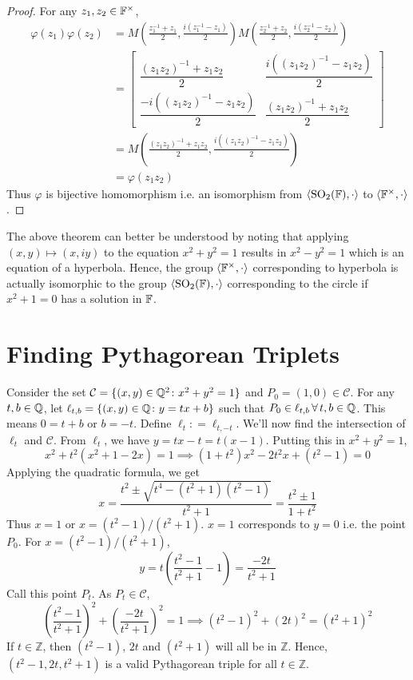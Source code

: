 \begin{proof}
    \noindent
    For any $z_1,z_2\in\mathbb{F}^\times$,
    \begin{align*}
        \varphi(z_1)\varphi(z_2) &= M\left(\frac{z_1^{-1}+z_1}{2},\frac{i(z_1^{-1}-z_1)}{2}\right)M\left(\frac{z_2^{-1}+z_2}{2},\frac{i(z_2^{-1}-z_2)}{2}\right) \\
                                 &= \begin{bmatrix}
                                        \dfrac{(z_1 z_2)^{-1} + z_1 z_2}{2} &
                                        \dfrac{i((z_1 z_2)^{-1} - z_1 z_2)}{2} \\
                                        \dfrac{-i((z_1 z_2)^{-1} - z_1 z_2)}{2} &
                                        \dfrac{(z_1 z_2)^{-1} + z_1 z_2}{2}
                                    \end{bmatrix} \\
                                 &= M\left(\frac{(z_1 z_2)^{-1} + z_1 z_2}{2},\frac{i((z_1 z_2)^{-1} - z_1 z_2)}{2}\right) \\
                                 &= \varphi(z_1 z_2)
    \end{align*}
    Thus $\varphi$ is bijective homomorphism i.e. an isomorphism from
    $\langle\mathrm{SO}_{2}(\mathbb{F}),\cdot\rangle$ to $\langle\mathbb{F}^\times,\cdot\rangle$.
\end{proof}

The above theorem can better be understood by noting that applying
$(x,y)\mapsto(x,iy)$ to the equation $x^2+y^2=1$ results in $x^2-y^2=1$ which is
an equation of a hyperbola. Hence, the group
$\langle\mathbb{F}^\times,\cdot\rangle$ corresponding to hyperbola is actually
isomorphic to the group $\langle\mathrm{SO}_{2}(\mathbb{F}),\cdot\rangle$ corresponding to the circle
if $x^2+1=0$ has a solution in $\mathbb{F}$.

\section{Finding Pythagorean Triplets}

Consider the set $\mathcal{C} = \{(x,y)\in\mathbb{Q}^2\colon x^2 + y^2 = 1\}$ and
$P_0 = (1,0)\in\mathcal{C}$. For any $t,b\in\mathbb{Q}$, let
$\ell_{t,b}=\{(x,y)\in\mathbb{Q}\colon y=tx+b\}$ such that
$P_0\in\ell_{t,b}\,\forall\,t,b\in\mathbb{Q}$. This means $0 = t + b$ or $b = -t$.
Define $\ell_t\colon=\ell_{t,-t}$. We'll now find the intersection of $\ell_t$ and
$\mathcal{C}$. From $\ell_t$, we have $y = tx - t = t(x - 1)$. Putting this in
$x^2 + y^2 = 1$,
\[ x^2 + t^2(x^2 + 1 - 2x) = 1 \implies (1+t^2)x^2 - 2 t^2 x + (t^2 - 1) = 0 \]
Applying the quadratic formula, we get
\[
    x = \frac{t^2 \pm \sqrt{t^4 - (t^2+1)(t^2-1)}}{t^2+1}
    = \frac{t^2 \pm 1}{1 + t^2}
\]
Thus $x = 1$ or $x = (t^2-1)/(t^2+1)$. $x=1$ corresponds to $y=0$ i.e. the point
$P_0$. For $x = (t^2-1)/(t^2+1)$,
\[ y = t\left(\frac{t^2-1}{t^2+1}-1\right) = \frac{-2t}{t^2+1} \]
Call this point $P_t$. As $P_t\in\mathcal{C}$,
\[
    \left(\frac{t^2-1}{t^2+1}\right)^2 + \left(\frac{-2t}{t^2+1}\right)^2 = 1
    \implies (t^2-1)^2 + (2t)^2 = (t^2+1)^2
\]
If $t\in\mathbb{Z}$, then $(t^2-1)$, $2t$ and $(t^2+1)$ will all be in
$\mathbb{Z}$. Hence, $(t^2-1, 2t, t^2+1)$ is a valid Pythagorean triple
for all $t\in\mathbb{Z}$.

